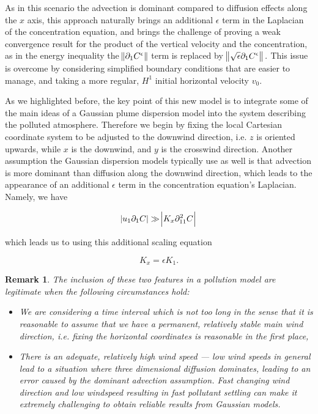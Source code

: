 \documentclass[11pt]{article}
\newtheorem{remark}{Remark}
\begin{document}
As in this scenario the advection is dominant compared to diffusion effects along the $x$ axis, this approach naturally brings an additional $\epsilon$ term in the Laplacian of the concentration equation, and brings the challenge of proving a weak convergence result for the product of the vertical velocity and the concentration, as in the energy inequality the $\norm{\partial_1 C^\epsilon}$ term is replaced by $\norm{\sqrt{\epsilon} \partial_1 C^\epsilon}.$ This issue is overcome by considering simplified boundary conditions that are easier to manage, and taking a more regular, $H^1$ initial horizontal velocity $v_0.$

As we highlighted before, the key point of this new model is to integrate some of the main ideas of a Gaussian plume dispersion model into the system describing the polluted atmosphere. Therefore we begin by fixing the local Cartesian coordinate system to be adjusted to the downwind direction, i.e. $z$ is oriented upwards, while $x$ is the downwind, and $y$ is the crosswind direction. Another assumption the Gaussian dispersion models typically use as well is that advection is more dominant than diffusion along the downwind direction, which leads to the appearance of an additional $\epsilon$ term in the concentration equation's Laplacian. Namely, we have

\begin{equation} \abs{u_1 \partial_{1} C} \gg \abs{ K_x \partial_{11} ^2 C }\end{equation}

which leads us to using this additional scaling equation

\begin{equation} \label{ksepsk1} K_x = \epsilon K_1.\end{equation}

\begin{remark} \normalfont
  The inclusion of these two features in a pollution model are legitimate when the following circumstances hold:
  \begin{itemize}
    \item We are considering a time interval which is not too long in the sense that it is reasonable to assume that we have a permanent, relatively stable main wind direction, i.e. fixing the horizontal coordinates is reasonable in the first place,
    \item There is an adequate, relatively high wind speed --- low wind speeds in general lead to a situation where three dimensional diffusion dominates, leading to an error caused by the dominant advection assumption. Fast changing wind direction and low windspeed resulting in fast pollutant settling can make it extremely challenging to obtain reliable results from Gaussian models.
  \end{itemize}
\end{remark}
\end{document}
